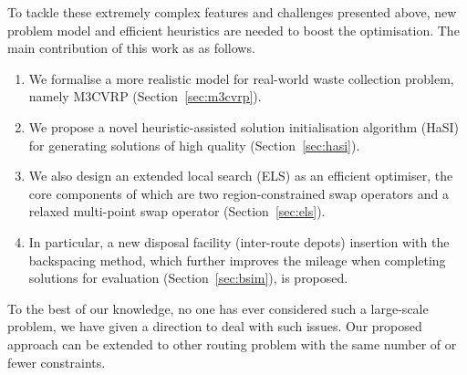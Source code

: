 \documentclass[journal]{IEEEtran}
\begin{document}
To tackle these extremely complex features and challenges presented above, new problem model and efficient heuristics are needed to boost the optimisation. The main contribution of this work as as follows. 
\begin{enumerate}[leftmargin=*,label=(\roman*)]
\item We formalise a more realistic model for real-world waste collection problem, namely M3CVRP (Section~\ref{sec:m3cvrp}). 
\item We propose a novel heuristic-assisted solution initialisation algorithm (HaSI) for generating solutions of high quality (Section~\ref{sec:hasi}).
\item We also design an extended local search (ELS) as an efficient optimiser, the core components of which are two region-constrained swap operators and a relaxed multi-point swap operator (Section~\ref{sec:els}). 
\item In particular, a new disposal facility (inter-route depots) insertion with the backspacing method, which further improves the mileage when completing solutions for evaluation (Section~\ref{sec:bsim}), is proposed.
\end{enumerate}
To the best of our knowledge, no one has ever considered such a large-scale problem, we have given a direction to deal with such issues. Our proposed approach can be extended to other routing problem with the same number of or fewer constraints.

\def\toolong{
\begin{enumerate}
    \item We design two new space-constrained swap operator and a new multi-point swap operator. 
    \item We propose a disposal facility (inter-route depots) insertion with backspace method.
    \item We adapted the MA framework to further improve the optimisation process.
    \item To the best of our knowledge, no one has ever considered such a large-scale problem, we've given a direction to deal with such problems.
    \item Our proposed approach can be approximated as a CVRP with the same number of or fewer constraints.
\end{enumerate}}
\end{document}
